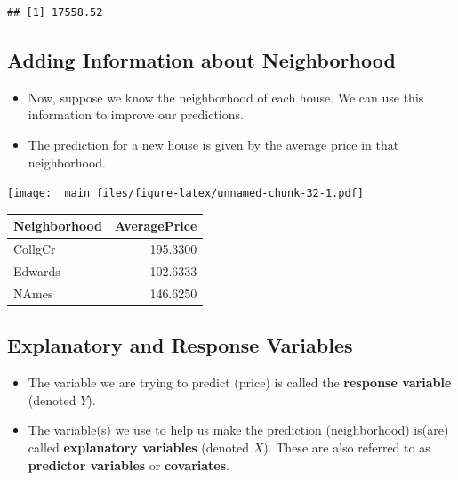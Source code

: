 \documentclass[]{book}
\newenvironment{Shaded}{\begin{snugshade}}{\end{snugshade}}
\newcommand{\KeywordTok}[1]{\textcolor[rgb]{0.13,0.29,0.53}{\textbf{#1}}}
\newcommand{\DecValTok}[1]{\textcolor[rgb]{0.00,0.00,0.81}{#1}}
\newcommand{\StringTok}[1]{\textcolor[rgb]{0.31,0.60,0.02}{#1}}
\newcommand{\OperatorTok}[1]{\textcolor[rgb]{0.81,0.36,0.00}{\textbf{#1}}}
\newcommand{\NormalTok}[1]{#1}
\begin{document}
\begin{Shaded}
\end{Shaded}

\begin{verbatim}
## [1] 17558.52
\end{verbatim}

\subsection{Adding Information about
Neighborhood}\label{adding-information-about-neighborhood}

\begin{itemize}
\item
  Now, suppose we know the neighborhood of each house. We can use this
  information to improve our predictions.
\item
  The prediction for a new house is given by the average price in that
  neighborhood.
\end{itemize}

\texttt{[image: \_main\_files/figure-latex/unnamed-chunk-32-1.pdf]}

\begin{tabular}{l|r}
\hline
Neighborhood & AveragePrice\\
\hline
CollgCr & 195.3300\\
\hline
Edwards & 102.6333\\
\hline
NAmes & 146.6250\\
\hline
\end{tabular}

\subsection{Explanatory and Response
Variables}\label{explanatory-and-response-variables}

\begin{itemize}
\item
  The variable we are trying to predict (price) is called the
  \textbf{response variable} (denoted \(Y\)).
\item
  The variable(s) we use to help us make the prediction (neighborhood)
  is(are) called \textbf{explanatory variables} (denoted \(X\)). These
  are also referred to as \textbf{predictor variables} or
  \textbf{covariates}.
\end{itemize}
\end{document}
